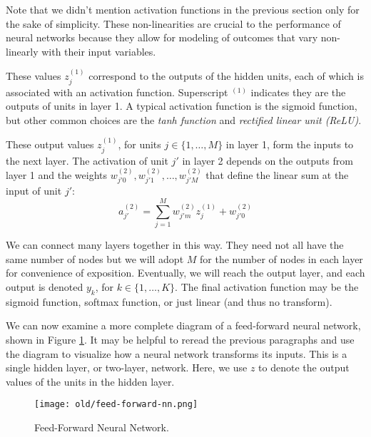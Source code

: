 \begin{warning}
    Note that we didn't mention activation functions in the previous section only for the sake of simplicity. These non-linearities are crucial to the performance of neural networks because they allow for modeling of outcomes that vary non-linearly with their input variables.
\end{warning}

These values $z^{(1)}_{j}$ correspond to the outputs of the hidden units, each of which is associated with an activation function. Superscript $^{(1)}$ indicates they are the outputs of units in layer 1.
A typical activation function is the  sigmoid function, but  other common choices are the {\em tanh function} and {\em  rectified linear unit (ReLU)}.

These output values $z^{(1)}_{j}$, for units $j\in \{1,\ldots,M\}$ in layer 1,
form the inputs to the next layer. The activation of unit $j'$ in layer 2 depends on the outputs from layer 1 and the weights $w^{(2)}_{j'0},w^{(2)}_{j'1},\ldots,w^{(2)}_{j'M}$ that define the linear sum at the input of unit $j'$:
%
\begin{equation} \label{basic-nn-form-next-layer}
	a^{(2)}_{j'} = \sum_{j=1}^{M} w_{j'm}^{(2)} z^{(1)}_{j} + w_{j'0}^{(2)}
      \end{equation}
      
      We can connect many layers together in this way. They need not all have the same number of nodes but we will adopt $M$ for the number of nodes in each layer for convenience of exposition. Eventually, we will reach the output layer, and each output is denoted $y_{k}$, for $k\in \{1,\dots,K\}$.
      The final activation function may be the sigmoid function, softmax function, or  just linear (and thus no transform).
      
We can now examine a more complete diagram of a feed-forward neural network, shown in Figure \ref{fig:feed-foward-nn}. It may be helpful to reread the previous paragraphs and use the diagram to visualize how a neural network transforms its inputs. This is a single hidden layer, or two-layer, network. Here, we use $z$ to denote the output values of the units in the hidden layer.

\begin{figure}
    \centering
    \texttt{[image: old/feed-forward-nn.png]}
    \caption{Feed-Forward Neural Network.}
    \label{fig:feed-foward-nn}
\end{figure}

